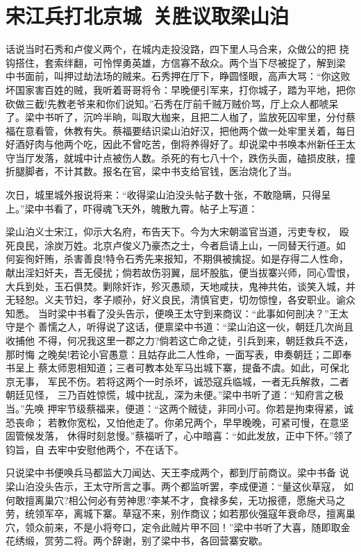\chapter{宋江兵打北京城~关胜议取梁山泊}

话说当时石秀和卢俊义两个，在城内走投没路，四下里人马合来，众做公的把
挠钩搭住，套索绊翻，可怜悍勇英雄，方信寡不敌众。两个当下尽被捉了，解到梁
中书面前，叫押过劫法场的贼来。石秀押在厅下，睁圆怪眼，高声大骂：“你这败
坏国家害百姓的贼，我听着哥哥将令：早晚便引军来，打你城子，踏为平地，把你
砍做三截!先教老爷来和你们说知。”石秀在厅前千贼万贼价骂，厅上众人都唬呆
了。梁中书听了，沉吟半晌，叫取大枷来，且把二人枷了，监放死囚牢里，分付蔡
福在意看管，休教有失。蔡福要结识梁山泊好汉，把他两个做一处牢里关着，每日
好酒好肉与他两个吃，因此不曾吃苦，倒将养得好了。却说梁中书唤本州新任王太
守当厅发落，就城中计点被伤人数。杀死的有七八十个，跌伤头面，磕损皮肤，撞
折腿脚者，不计其数。报名在官，梁中书支给官钱，医治烧化了当。

次日，城里城外报说将来：“收得梁山泊没头帖子数十张，不敢隐瞒，只得呈
上。”梁中书看了，吓得魂飞天外，魄散九霄。帖子上写道：

梁山泊义士宋江，仰示大名府，布告天下。今为大宋朝滥官当道，污吏专权，
殴死良民，涂炭万姓。北京卢俊义乃豪杰之士，今者启请上山，一同替天行道。如
何妄徇奸贿，杀害善良!特令石秀先来报知，不期俱被擒捉。如是存得二人性命，
献出淫妇奸夫，吾无侵扰；倘若故伤羽翼，屈坏股肱，便当拔寨兴师，同心雪恨，
大兵到处，玉石俱焚。剿除奸诈，殄灭愚顽，天地咸扶，鬼神共佑，谈笑入城，并
无轻恕。义夫节妇，孝子顺孙，好义良民，清慎官吏，切勿惊惶，各安职业。谕众
知悉。
当时梁中书看了没头告示，便唤王太守到来商议：“此事如何剖决？”王太守是个
善懦之人，听得说了这话，便禀梁中书道：“梁山泊这一伙，朝廷几次尚且收捕他
不得，何况我这里一郡之力?倘若这亡命之徒，引兵到来，朝廷救兵不迭，那时悔
之晚矣!若论小官愚意：且姑存此二人性命，一面写表，申奏朝廷；二即奉书呈上
蔡太师恩相知道；三者可教本处军马出城下寨，提备不虞。如此，可保北京无事，
军民不伤。若将这两个一时杀坏，诚恐寇兵临城，一者无兵解救，二者朝廷见怪，
三乃百姓惊慌，城中扰乱，深为未便。”梁中书听了道：“知府言之极当。”先唤
押牢节级蔡福来，便道：“这两个贼徒，非同小可。你若是拘束得紧，诚恐丧命；
若教你宽松，又怕他走了。你弟兄两个，早早晚晚，可紧可慢，在意坚固管候发落，
休得时刻怠慢。”蔡福听了，心中暗喜：“如此发放，正中下怀。”领了钧旨，自
去牢中安慰他两个，不在话下。

只说梁中书便唤兵马都监大刀闻达、天王李成两个，都到厅前商议。梁中书备
说梁山泊没头告示，王太守所言之事。两个都监听罢，李成便道：“量这伙草寇，
如何敢擅离巢穴?相公何必有劳神思?李某不才，食禄多矣，无功报德，愿施犬马之
劳，统领军卒，离城下寨。草寇不来，别作商议；如若那伙强寇年衰命尽，擅离巢
穴，领众前来，不是小将夸口，定令此贼片甲不回！”梁中书听了大喜，随即取金
花绣缎，赏劳二将。两个辞谢，别了梁中书，各回营寨安歇。

